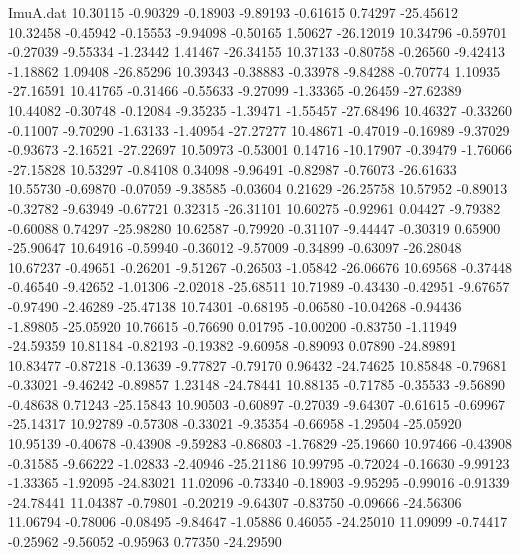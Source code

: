 \begin{filecontents}{ImuA.dat}
  10.30115   -0.90329   -0.18903   -9.89193   -0.61615    0.74297  -25.45612
  10.32458   -0.45942   -0.15553   -9.94098   -0.50165    1.50627  -26.12019
  10.34796   -0.59701   -0.27039   -9.55334   -1.23442    1.41467  -26.34155
  10.37133   -0.80758   -0.26560   -9.42413   -1.18862    1.09408  -26.85296
  10.39343   -0.38883   -0.33978   -9.84288   -0.70774    1.10935  -27.16591
  10.41765   -0.31466   -0.55633   -9.27099   -1.33365   -0.26459  -27.62389
  10.44082   -0.30748   -0.12084   -9.35235   -1.39471   -1.55457  -27.68496
  10.46327   -0.33260   -0.11007   -9.70290   -1.63133   -1.40954  -27.27277
  10.48671   -0.47019   -0.16989   -9.37029   -0.93673   -2.16521  -27.22697
  10.50973   -0.53001    0.14716  -10.17907   -0.39479   -1.76066  -27.15828
  10.53297   -0.84108    0.34098   -9.96491   -0.82987   -0.76073  -26.61633
  10.55730   -0.69870   -0.07059   -9.38585   -0.03604    0.21629  -26.25758
  10.57952   -0.89013   -0.32782   -9.63949   -0.67721    0.32315  -26.31101
  10.60275   -0.92961    0.04427   -9.79382   -0.60088    0.74297  -25.98280
  10.62587   -0.79920   -0.31107   -9.44447   -0.30319    0.65900  -25.90647
  10.64916   -0.59940   -0.36012   -9.57009   -0.34899   -0.63097  -26.28048
  10.67237   -0.49651   -0.26201   -9.51267   -0.26503   -1.05842  -26.06676
  10.69568   -0.37448   -0.46540   -9.42652   -1.01306   -2.02018  -25.68511
  10.71989   -0.43430   -0.42951   -9.67657   -0.97490   -2.46289  -25.47138
  10.74301   -0.68195   -0.06580  -10.04268   -0.94436   -1.89805  -25.05920
  10.76615   -0.76690    0.01795  -10.00200   -0.83750   -1.11949  -24.59359
  10.81184   -0.82193   -0.19382   -9.60958   -0.89093    0.07890  -24.89891
  10.83477   -0.87218   -0.13639   -9.77827   -0.79170    0.96432  -24.74625
  10.85848   -0.79681   -0.33021   -9.46242   -0.89857    1.23148  -24.78441
  10.88135   -0.71785   -0.35533   -9.56890   -0.48638    0.71243  -25.15843
  10.90503   -0.60897   -0.27039   -9.64307   -0.61615   -0.69967  -25.14317
  10.92789   -0.57308   -0.33021   -9.35354   -0.66958   -1.29504  -25.05920
  10.95139   -0.40678   -0.43908   -9.59283   -0.86803   -1.76829  -25.19660
  10.97466   -0.43908   -0.31585   -9.66222   -1.02833   -2.40946  -25.21186
  10.99795   -0.72024   -0.16630   -9.99123   -1.33365   -1.92095  -24.83021
  11.02096   -0.73340   -0.18903   -9.95295   -0.99016   -0.91339  -24.78441
  11.04387   -0.79801   -0.20219   -9.64307   -0.83750   -0.09666  -24.56306
  11.06794   -0.78006   -0.08495   -9.84647   -1.05886    0.46055  -24.25010
  11.09099   -0.74417   -0.25962   -9.56052   -0.95963    0.77350  -24.29590

\end{filecontents}
